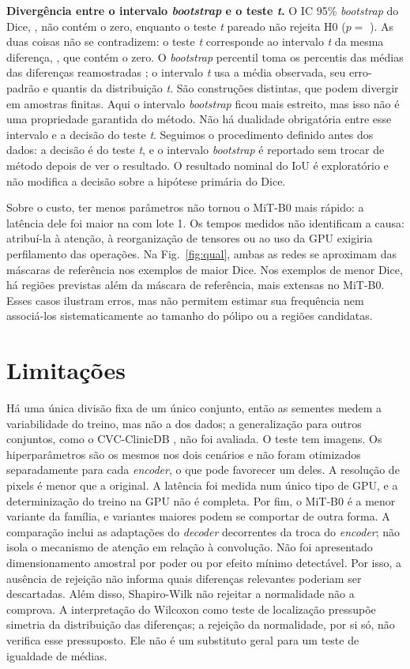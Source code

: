 \documentclass[conference]{IEEEtran}
\begin{document}
\textbf{Divergência entre o intervalo \textit{bootstrap} e o teste \textit{t}.} O IC 95\%
\textit{bootstrap} do Dice, \DiceCI{}, não contém o zero, enquanto o teste \textit{t} pareado não
rejeita H0 ($p = $ \DiceTP{}). As duas coisas não se contradizem: o teste \textit{t} corresponde
ao intervalo \textit{t} da mesma diferença, \DiceCIt{}, que contém o zero. O \textit{bootstrap}
percentil toma os percentis das médias das diferenças reamostradas
\cite{efron1979bootstrap}; o intervalo \textit{t} usa a média observada, seu erro-padrão e
quantis da distribuição \textit{t}. São construções distintas, que podem divergir em
amostras finitas. Aqui o intervalo \textit{bootstrap} ficou mais estreito, mas isso não é
uma propriedade garantida do método. Não há dualidade obrigatória entre esse intervalo
e a decisão do teste \textit{t}.
Seguimos o procedimento definido antes dos dados: a decisão é do teste \textit{t}, e o intervalo
\textit{bootstrap} é reportado sem trocar de método depois de ver o resultado. O resultado
nominal do IoU é exploratório e não modifica a decisão sobre a hipótese primária do Dice.

Sobre o custo, ter menos parâmetros não tornou o MiT-B0 mais rápido: a latência dele foi maior
na \LatDevice{} com lote 1. Os tempos medidos não identificam a causa: atribuí-la à atenção,
à reorganização de tensores ou ao uso da GPU exigiria perfilamento das operações.
Na Fig.~\ref{fig:qual}, ambas as redes se aproximam das máscaras de referência nos exemplos
de maior Dice. Nos exemplos de menor Dice, há regiões previstas além da máscara de
referência, mais extensas no MiT-B0. Esses casos ilustram erros, mas não permitem estimar
sua frequência nem associá-los sistematicamente ao tamanho do pólipo ou a regiões candidatas.

\section{Limitações}

Há uma única divisão fixa de um único conjunto, então as sementes medem a variabilidade do
treino, mas não a dos dados; a generalização para outros conjuntos, como o CVC-ClinicDB
\cite{bernal2015cvc}, não foi avaliada. O teste tem \NTest{} imagens. Os hiperparâmetros são os
mesmos nos dois cenários e não foram otimizados separadamente para cada \textit{encoder}, o que
pode favorecer um deles. A resolução de \ImageSize{} pixels é menor que a original. A latência
foi medida num único tipo de GPU, e a determinização do treino na GPU não é completa. Por fim,
o MiT-B0 é a menor variante da família, e variantes maiores podem se comportar de outra forma.
A comparação inclui as adaptações do \textit{decoder} decorrentes da troca do
\textit{encoder}; não isola o mecanismo de atenção em relação à convolução.
Não foi apresentado dimensionamento amostral por poder ou por efeito mínimo detectável.
Por isso, a ausência de rejeição não informa quais diferenças relevantes poderiam ser
descartadas. Além disso, Shapiro-Wilk não rejeitar a normalidade não a comprova. A
interpretação do Wilcoxon como teste de localização pressupõe simetria da distribuição
das diferenças; a rejeição da normalidade, por si só, não verifica esse pressuposto. Ele
não é um substituto geral para um teste de igualdade de médias.
\end{document}
